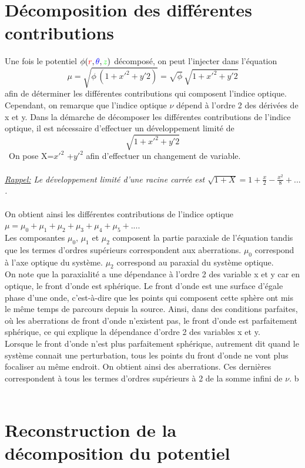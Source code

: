 \documentclass{report}
\begin{document}
\section{Décomposition des différentes contributions}
Une fois le potentiel  $\phi ({\color{red}r},{\color{blue}\theta},{\color{green}z})$ décomposé, on peut l'injecter dans l'équation 
\[
\mu = \sqrt{\phi \, (1+x'^2+y'2)}=\sqrt{\phi} \, \sqrt{1+x'^2+y'2}
\]
afin de déterminer les différentes contributions qui composent l'indice optique. 
\
\\
Cependant, on remarque que l'indice optique $\nu$ dépend à l'ordre 2 des dérivées de x et y. 
Dans la démarche de décomposer les différentes contributions de l'indice optique, il est nécessaire d'effectuer un développement limité de 
\[
\sqrt{1+x'^2+y'2}
\] 
\
On pose X=$x'^2$ +$y'^2$ afin d'effectuer un changement de variable. 
\
\\
\\
{\textit{
{\underline{Rappel:}} 
Le développement limité d'une racine carrée est $\sqrt{1+X}=1+\frac{x}{2}-\frac{x^2}{8}+...$. 
}}
\
\\
\\
On obtient ainsi les différentes contributions de l'indice optique $\mu=\mu_0+\mu_1+\mu_2+\mu_3+\mu_4+\mu_5+...$. 
\
\\
Les composantes $\mu_0$, $\mu_1$ et $\mu_2$ composent la partie paraxiale de l'équation tandis que les 
termes d'ordres supérieurs correspondent aux aberrations. $\mu_0$ correspond à l'axe optique du système. 
$\mu_2$ correspond au paraxial du système optique.  
\
\\
On note que la paraxialité a une dépendance à l'ordre 2 des variable x et y car en optique, le front d'onde est sphérique. Le front d'onde est une surface 
d'égale phase d'une onde, c'est-à-dire que les points qui composent cette sphère ont mis le même temps de parcours depuis la source. Ainsi, dans des conditions parfaites, où les aberrations 
de front d'onde n'existent pas, le front d'onde est parfaitement sphérique, ce qui explique la dépendance d'ordre 2 des variables x et y. 
\\
Lorsque le front d'onde n'est plus parfaitement sphérique, autrement dit quand le système connait une perturbation, tous les points du front d'onde ne vont plus focaliser au même endroit. 
On obtient ainsi des aberrations. Ces dernières correspondent à tous les termes d'ordres supérieurs à 2 de la somme infini de $\nu$. b
\
\section{Reconstruction de la décomposition du potentiel}
\end{document}
